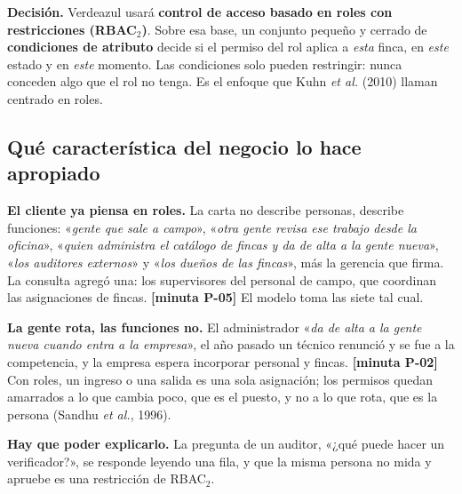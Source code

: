 \documentclass[11pt,letterpaper]{article}
\newcommand{\resp}[1]{\textrm{\footnotesize\bfseries [minuta #1]}}
\newcommand{\carta}[1]{«\emph{#1}»}
\begin{document}
\begin{decision}
\textbf{Decisión.} Verdeazul usará \textbf{control de acceso basado en roles con restricciones
(RBAC$_2$)}. Sobre esa base, un conjunto pequeño y cerrado de \textbf{condiciones de atributo} decide si
el permiso del rol aplica a \emph{esta} finca, en \emph{este} estado y en \emph{este} momento. Las
condiciones solo pueden restringir: nunca conceden algo que el rol no tenga. Es el enfoque que Kuhn
\emph{et al.} (2010) llaman centrado en roles.
\end{decision}

\subsection{Qué característica del negocio lo hace apropiado}

\textbf{El cliente ya piensa en roles.} La carta no describe personas, describe funciones: \carta{gente que
sale a campo}, \carta{otra gente revisa ese trabajo desde la oficina}, \carta{quien administra el catálogo de
fincas y da de alta a la gente nueva}, \carta{los auditores externos} y \carta{los dueños de las fincas}, más
la gerencia que firma. La consulta agregó una: los supervisores del personal de campo, que coordinan
las asignaciones de fincas. \resp{P-05} El modelo toma las siete tal cual.

\textbf{La gente rota, las funciones no.} El administrador \carta{da de alta a la gente nueva cuando entra a
la empresa}, el año pasado un técnico renunció y se fue a la competencia, y la empresa espera
incorporar personal y fincas. \resp{P-02} Con roles, un ingreso o una salida es una sola asignación;
los permisos quedan amarrados a lo que cambia poco, que es el puesto, y no a lo que rota, que es la
persona (Sandhu \emph{et al.}, 1996).

\textbf{Hay que poder explicarlo.} La pregunta de un auditor, «¿qué puede hacer un verificador?», se
responde leyendo una fila, y que la misma persona no mida y apruebe es una restricción de RBAC$_2$.
\end{document}
